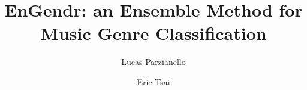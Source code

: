 \title[EnGendr -- Music Genre Classification]{EnGendr: an Ensemble Method for Music Genre Classification}

\setreviewson


\author{Lucas Parzianello}


\author{Eric Tsai}

\renewcommand{\shortauthors}{Parzianello and Tsai}



